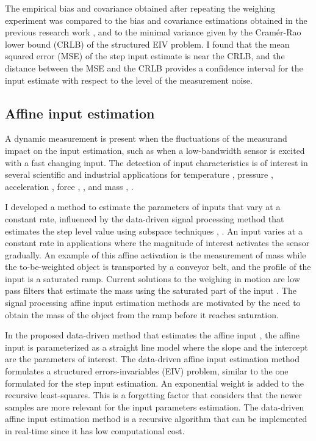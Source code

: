 The empirical bias and covariance obtained after repeating the weighing experiment was compared to the bias and covariance estimations obtained in the previous research work \citep{QuintanaCSDA}, and to the minimal variance given by the  Cram\'er-Rao lower bound (CRLB) of the structured EIV problem.
I found that the mean squared error (MSE) of the step input estimate is near the CRLB, and the distance between the MSE and the CRLB provides a confidence interval for the input estimate with respect to the level of the measurement noise. 

 
\subsection{Affine input estimation}

A dynamic measurement is present when the fluctuations of the measurand impact on the input estimation, such as when a low-bandwidth sensor is excited with a fast changing input.
The detection of input characteristics is of interest in several scientific and industrial applications for temperature \citep{Saggin01}, pressure \citep{Matthews14}, acceleration \citep{Link07}, force \citep{Vlajic16}, \citep{Hessling08a}, and mass \citep{Shu93}, \citep{Boschetti13}.

I developed a method to estimate the parameters of inputs that vary at a constant rate, influenced by the data-driven signal processing method that estimates the step level value using subspace techniques \citep{Markovsky15cep}, \citep{Markovsky15ieee}.
An input varies at a constant rate in applications where the magnitude of interest activates the sensor gradually. 
An example of this affine activation is the measurement of mass while the to-be-weighted object is transported by a conveyor belt, and the profile of the input is a saturated ramp.
Current solutions to the weighing in motion are low pass filters that estimate the mass using the saturated part of the input \citep{Tasaki07, Pietrzak14}.
The signal processing affine input estimation methods are motivated by the need to obtain the mass of the object from the ramp before it reaches saturation.

In the proposed data-driven method that estimates the affine input \citep{QuintanaMEAS},
the affine input is parameterized as a straight line model where the slope and the intercept are the parameters of interest.
The data-driven affine input estimation method formulates a structured errors-invariables (EIV) problem, similar to the one formulated for the step input estimation.
An exponential weight is added to the recursive least-squares.
This is a forgetting factor that considers that the newer samples are more relevant for the input parameters estimation.
The data-driven affine input estimation method is a recursive algorithm that can be implemented in real-time since it has low computational cost.

